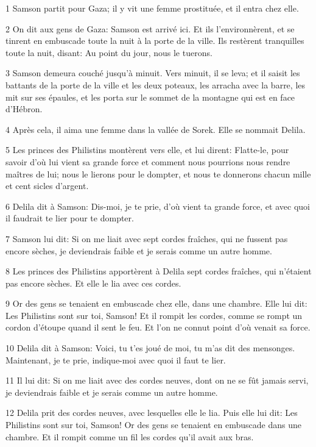 \par 1 Samson partit pour Gaza; il y vit une femme prostituée, et il entra chez elle.
\par 2 On dit aux gens de Gaza: Samson est arrivé ici. Et ils l'environnèrent, et se tinrent en embuscade toute la nuit à la porte de la ville. Ils restèrent tranquilles toute la nuit, disant: Au point du jour, nous le tuerons.
\par 3 Samson demeura couché jusqu'à minuit. Vers minuit, il se leva; et il saisit les battants de la porte de la ville et les deux poteaux, les arracha avec la barre, les mit sur ses épaules, et les porta sur le sommet de la montagne qui est en face d'Hébron.
\par 4 Après cela, il aima une femme dans la vallée de Sorek. Elle se nommait Delila.
\par 5 Les princes des Philistins montèrent vers elle, et lui dirent: Flatte-le, pour savoir d'où lui vient sa grande force et comment nous pourrions nous rendre maîtres de lui; nous le lierons pour le dompter, et nous te donnerons chacun mille et cent sicles d'argent.
\par 6 Delila dit à Samson: Dis-moi, je te prie, d'où vient ta grande force, et avec quoi il faudrait te lier pour te dompter.
\par 7 Samson lui dit: Si on me liait avec sept cordes fraîches, qui ne fussent pas encore sèches, je deviendrais faible et je serais comme un autre homme.
\par 8 Les princes des Philistins apportèrent à Delila sept cordes fraîches, qui n'étaient pas encore sèches. Et elle le lia avec ces cordes.
\par 9 Or des gens se tenaient en embuscade chez elle, dans une chambre. Elle lui dit: Les Philistins sont sur toi, Samson! Et il rompit les cordes, comme se rompt un cordon d'étoupe quand il sent le feu. Et l'on ne connut point d'où venait sa force.
\par 10 Delila dit à Samson: Voici, tu t'es joué de moi, tu m'as dit des mensonges. Maintenant, je te prie, indique-moi avec quoi il faut te lier.
\par 11 Il lui dit: Si on me liait avec des cordes neuves, dont on ne se fût jamais servi, je deviendrais faible et je serais comme un autre homme.
\par 12 Delila prit des cordes neuves, avec lesquelles elle le lia. Puis elle lui dit: Les Philistins sont sur toi, Samson! Or des gens se tenaient en embuscade dans une chambre. Et il rompit comme un fil les cordes qu'il avait aux bras.
